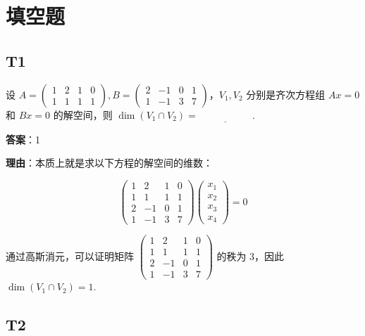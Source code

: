 \documentclass{article}
\begin{document}
\section{填空题}

\subsection{T1}

\par 设 $A=\begin{pmatrix}
	1 & 2 & 1 & 0\\
	1 & 1 & 1 & 1
\end{pmatrix}, B = \begin{pmatrix}
	2 & -1 & 0 & 1\\
	1 & -1 & 3 & 7
\end{pmatrix}$，$V_1, V_2$ 分别是齐次方程组 $Ax=0$ 和 $Bx=0$ 的解空间，则 $\dim(V_1\cap V_2)=\underline{\phantom{empty\_space}}$.

\par \textbf{答案}：1

\par \textbf{理由}：本质上就是求以下方程的解空间的维数：

\begin{equation*}
	\begin{pmatrix}
		1 & 2 & 1 & 0\\
		1 & 1 & 1 & 1\\
		2 & -1 & 0 & 1\\
		1 & -1 & 3 & 7
	\end{pmatrix} \begin{pmatrix}
		x_1\\x_2\\x_3\\x_4
	\end{pmatrix}=0
\end{equation*}

\par 通过高斯消元，可以证明矩阵 $\begin{pmatrix}
	1 & 2 & 1 & 0\\
	1 & 1 & 1 & 1\\
	2 & -1 & 0 & 1\\
	1 & -1 & 3 & 7
\end{pmatrix}$ 的秩为 3，因此 $\dim(V_1\cap V_2)=1$.

\subsection{T2}
\end{document}
